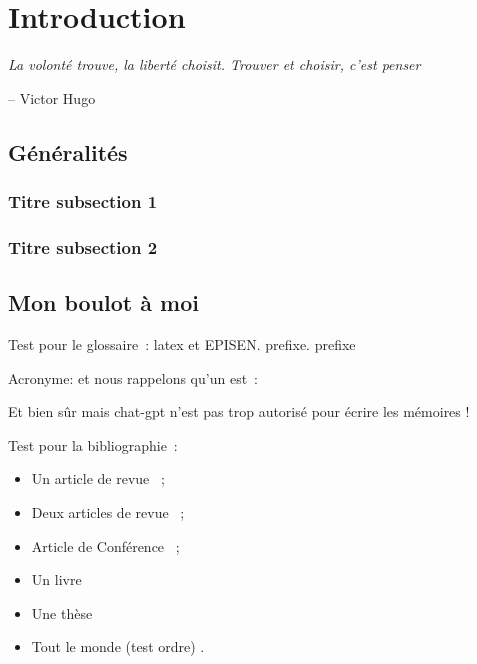 \chapter*{Introduction}
\label{chap:intro}
\epigraph{\itshape  La volonté trouve, la liberté choisit. Trouver et choisir, c'est penser}{-- Victor Hugo}

{}
\section*{Généralités}
\lipsum[1]

\lipsum[2]

{}
\subsection*{Titre subsection 1}

\lipsum[3]

\lipsum[4]

{}
\subsection*{Titre subsection 2}

\lipsum[5]

\lipsum[6]

{}
\section*{Mon boulot à moi}

 \noindent Test pour le glossaire~:  \Gls{latex} et \Gls{EPISEN}. \Gls{prefixe}.
 \gls{prefixe}


 \noindent Acronyme:  et nous rappelons qu'un  est~: 


 \noindent Et bien sûr  mais chat-gpt n'est pas trop autorisé pour écrire les mémoires !  


\noindent Test pour la bibliographie~:
\begin{itemize}
\item Un article de revue \cite{ref1}~;
\item Deux articles de revue \cite{ref2,ref1}~;
\item Article de Conférence \cite{ref3}~;
\item Un livre \cite{ref4}
\item Une thèse \cite{ref5}
\item Tout le monde (test ordre) \cite{ref4,ref1,ref5,ref2,ref3}.
\end{itemize}

